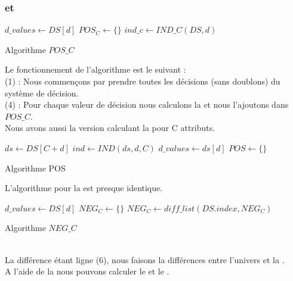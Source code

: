 \subsubsection{\posreg et \negreg}
\begin{algorithm}[h!]
	\SetAlgoLined
	\LinesNumbered
	$d\_values \gets DS[d]$ \;
	$POS_C \gets \{\}$ \;
	$ind\_c \gets IND\_C(DS, d)$ \;
	\caption{Algorithme $POS\_C$}
\end{algorithm}
Le fonctionnement de l'algorithme est le suivant : \\
(1) : Nous commençons par prendre toutes les décisions (sans doublons)
du système de décision. \\
(4) : Pour chaque valeur de décision nous calculons la \blower et nous
l'ajoutons dans $POS\_C$. \\
Nous avons aussi la version calculant la \posreg pour C attributs. \\
\begin{algorithm}[h!]
	\SetAlgoLined
	\LinesNumbered
	$ds \gets DS[C + d]$ \;
	$ind \gets IND(ds, d, C)$ \;
	$d\_values \gets ds[d]$ \;
	$POS \gets \{\}$ \;
	\caption{Algorithme POS}
\end{algorithm}
\newpage
L'algorithme pour la \negreg est presque identique. \\
\begin{algorithm}[h!]
	\SetAlgoLined
	\LinesNumbered
	$d\_values \gets DS[d]$ \;
	$NEG_C \gets \{\}$ \;
	$NEG_C \gets diff\_list(DS.index, NEG_C)$
	\caption{Algorithme $NEG\_C$}
\end{algorithm} \\
La différence étant ligne (6), nous faisons la différences entre
l'univers et la \negreg. \\
A l'aide de la \posreg nous pouvons calculer le \reduct et le \core.
